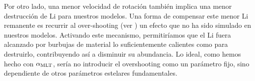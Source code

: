 Por otro lado, una menor velocidad de rotación también implica una menor destrucción de Li para nuestros modelos. Una forma de compensar este menor Li remanente es recurrir al over-shooting (ver \cite{Caballero2020}) un efecto que no ha sido simulado en nuestros modelos. Activando este mecanismo, permitiríamos que el Li fuera alcanzado por burbujas de material lo suficientemente calientes como para destruirlo, contribuyendo así a disminuir su abundancia. Lo ideal, como hemos hecho con $\alpha_{\mathrm{MLT}}$, sería no introducir el overshooting como un parámetro fijo, sino dependiente de otros parámetros estelares fundamentales.\par



\endinput

